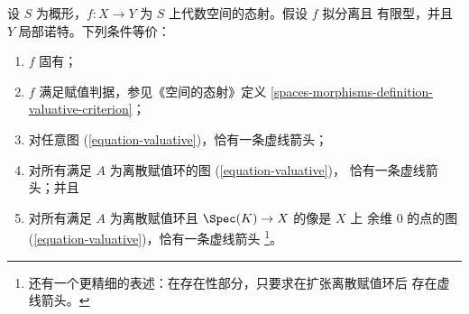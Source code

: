 \begin{lemma}
\label{lemma-Noetherian-dvr-valuative-proper}
设 $S$ 为概形，$f : X \to Y$ 为 $S$ 上代数空间的态射。假设 $f$ 拟分离且
有限型，并且 $Y$ 局部诺特。下列条件等价：
\begin{enumerate}
\item $f$ 固有；
\item $f$ 满足赋值判据，参见《空间的态射》定义
\ref{spaces-morphisms-definition-valuative-criterion}；
\item 对任意图 (\ref{equation-valuative})，恰有一条虚线箭头；
\item 对所有满足 $A$ 为离散赋值环的图 (\ref{equation-valuative})，
恰有一条虚线箭头；并且
\item 对所有满足 $A$ 为离散赋值环且 $\Spec(K) \to X$ 的像是 $X$ 上
余维 $0$ 的点的图 (\ref{equation-valuative})，恰有一条虚线箭头
\footnote{还有一个更精细的表述：在存在性部分，只要求在扩张离散赋值环后
存在虚线箭头。}。 %
\end{enumerate}
\end{lemma}

